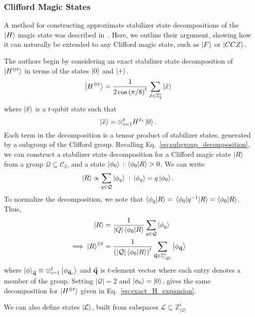 \subsubsection{Clifford Magic States}
A method for constructing approximate stabilizer state decompositions of the $\ket{H}$ magic state was described in~\cite{Bravyi2016}. Here, we outline their argument, showing how it can naturally be extended to any Clifford magic state, such as $\ket{F}$ or $\ket{CCZ}$.\par
The authors begin by considering an exact stabilizer state decomposition of $\ket{H^{\otimes t}}$ in terms of the states $\ket{0}$ and $\ket{+}$.
\begin{equation}
\ket{H^{\otimes t}} = \frac{1}{2\cos\left(\pi/8\right)^{t}}\sum_{\tilde{x}\in\mathbb{Z}_{2}^{t}} \ket{\tilde{x}}
\label{eq:exact_H_expansion}
\end{equation}
where $\ket{\tilde{x}}$ is a $t$-qubit state such that
\begin{equation}
\ket{\tilde{x}}=\otimes_{i=1}^{t} H^{\tilde{x}_{i}}\ket{0}
\label{eq:xtilde_bits}.
\end{equation}
Each term in the decomposition is a tensor product of stabilizer states, generated by a subgroup of the Clifford group. Recalling Eq.~\ref{eq:subgroup_decomposition}, we can construct a stabilizer state decomposition for a Clifford magic state $\ket{R}$ from a group $\mathcal{Q}\subseteq \mathcal{C}_{2}$, and a state $\ket{\phi_{0}}\,:\,\braket{\phi_{0}}{R}>0$. We can write
\[\ket{R}\propto \sum_{q\in\mathcal{Q}}\ket{\phi_{q}} \;:\,\ket{\phi_{q}}=q\ket{\phi_{0}}.\]
To normalize the decomposition, we note that $\braket{\phi_{q}}{R}=\matrixel{\phi_{0}}{q^{-1}}{R}=\braket{\phi_{0}}{R}$. Thus, 
\begin{align}
\ket{R}& =\frac{1}{\left|Q\right|\braket{\phi_{0}}{R}}\sum_{q\in\mathcal{Q}}\ket{\phi_{q}} \nonumber \\
\implies \ket{R}^{\otimes t}&=\frac{1}{\left(\left|\mathcal{Q}\right|\braket{\phi_{0}}{R}\right)^{t}}\sum_{\va{q}\in\mathbb{Z}_{\left|\mathcal{Q}\right|}^{t}}\ket{\phi_{\va{q}}}
\label{eq:clifford_sym_decomposition}
\end{align}
where $\ket{\phi}_{\va{q}}\equiv\otimes_{i=1}^{t}\ket{\phi_{\va{q}_{i}}}$ and $\va{q}$ is $t$-element vector where each entry denotes a member of the group. Setting $\left|\mathcal{Q}\right|=2$ and $\ket{\phi_{0}}=\ket{0}$, gives the same decomposition for $\ket{H^{\otimes t}}$ given in Eq.~\ref{eq:exact_H_expansion}.\par
We can also define states $\ket{\mathcal{L}}$, built from subspaces $\mathcal{L}\subseteq\mathbb{Z}_{\left|\mathcal{Q}\right|}^{t}$
